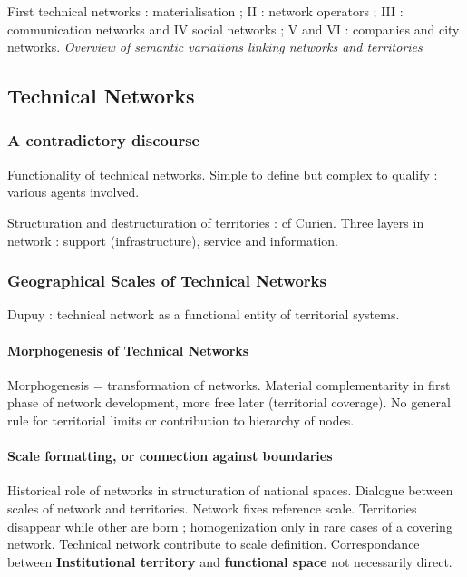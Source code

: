 First technical networks : materialisation ; II : network operators ; III : communication networks and IV social networks ; V and VI : companies and city networks.  \textit{Overview of semantic variations linking networks and territories}

\subsection{Technical Networks}

\subsubsection*{A contradictory discourse}

Functionality of technical networks. Simple to define but complex to qualify : various agents involved.

Structuration and destructuration of territories : cf Curien. Three layers in network : support (infrastructure), service and information.

\subsubsection*{Geographical Scales of Technical Networks}

Dupuy : technical network as a functional entity of territorial systems. 

\paragraph{Morphogenesis of Technical Networks}

Morphogenesis = transformation of networks. Material complementarity in first phase of network development, more free later (territorial coverage). No general rule for territorial limits or contribution to hierarchy of nodes.

\paragraph{Scale formatting, or connection against boundaries}

Historical role of networks in structuration of national spaces. Dialogue between scales of network and territories. Network fixes reference scale. Territories disappear while other are born ; homogenization only in rare cases of a covering network. Technical network contribute to scale definition. Correspondance between \textbf{Institutional territory} and \textbf{functional space} not necessarily direct.

